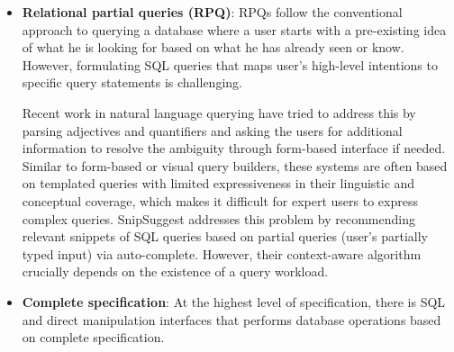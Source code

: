 \documentclass{sig-alternate-05-2015}
\begin{document}
\begin{itemize}
\item \textbf{Relational partial queries (RPQ)}: RPQs follow the conventional approach to querying a database where a user starts with a pre-existing idea of what he is looking for based on what he has already seen or know. However, formulating SQL queries that maps user's high-level intentions to specific query statements is challenging. 
\par Recent work in natural language querying have tried to address this by parsing adjectives and quantifiers and asking the users for additional information to resolve the ambiguity through form-based interface if needed. Similar to form-based or visual query builders\cite{Abouzied2012}, these systems are often based on templated queries with limited expressiveness in their linguistic and conceptual coverage, which makes it difficult for expert users to express complex queries. SnipSuggest addresses this problem by recommending relevant snippets of SQL queries based on partial queries (user's partially typed input) via auto-complete\cite{Khoussainova2010}. However, their context-aware algorithm crucially depends on the existence of a query workload. 
\item \textbf{Complete specification}: At the highest level of specification, there is SQL and direct manipulation interfaces that performs database operations based on complete specification.
\end{itemize}
\end{document}
